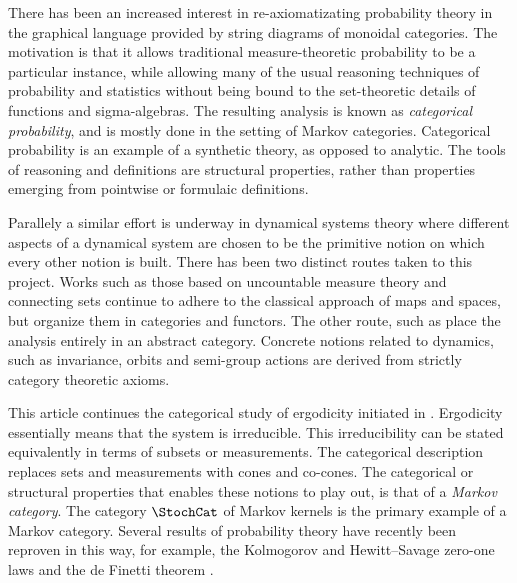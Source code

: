 \documentclass[12pt,oneside,pb-diagram]{article}
\begin{document}
There has been an increased interest \cite[e.g.]{ChoJacobs2019disintegr, fritz2020Stoch, FritzLiang2023gs} in re-axiomatizating probability theory in the graphical language provided by string diagrams of monoidal categories. The motivation is that it allows traditional measure-theoretic probability to be a particular instance, while allowing many of the usual reasoning techniques of probability and statistics without being bound to the set-theoretic details of functions and sigma-algebras. The resulting analysis is known as \emph{categorical probability}, and is mostly done in the setting of Markov categories. Categorical probability is an example of a synthetic theory, as opposed to analytic. The tools of reasoning and definitions are structural properties, rather than properties emerging from pointwise or formulaic definitions.

Parallely a similar effort is underway in dynamical systems theory \cite[e.g.]{mrozek1990leray, RobbinSalamon1992, VagnerSpivakLerman2015, Spivak2015steady, DasSuda2024recon, DasSuda2025enrich} where different aspects of a dynamical system are chosen to be the primitive notion on which every other notion is built. There has been two distinct routes taken to this project. Works such as those based on uncountable measure theory \cite{JamneshanTao2022uncount, Jamneshan2023uncount, JamneshanTao2024uncount} and connecting sets \cite[e.g.]{mrozek1990leray, RobbinSalamon1992} continue to adhere to the classical approach of maps and spaces, but organize them in categories and functors. The other route, such as \cite{Suda2022Poincare, MossPerrone2022ergdc, Suda2023dynamical, DasSuda2025enrich} place the analysis entirely in an abstract category. Concrete notions related to dynamics, such as invariance, orbits and semi-group actions are derived from strictly category theoretic axioms.

This article continues the categorical study of ergodicity initiated in \cite{MossPerrone2022ergdc}. Ergodicity essentially means that the system is irreducible. This irreducibility can be stated equivalently in terms of subsets or measurements. The categorical description replaces sets and measurements with cones and co-cones. The categorical or structural properties that enables these notions to play out, is that of a \emph{Markov category}.  The category $\StochCat$ of Markov kernels is the primary example of a Markov category. Several results of probability theory have recently been reproven in this way, for example, the Kolmogorov and Hewitt–Savage zero-one laws \cite{FritzRischel2020inf} and the de Finetti theorem \cite{FritzEtAl2021definetti}. 
\end{document}
